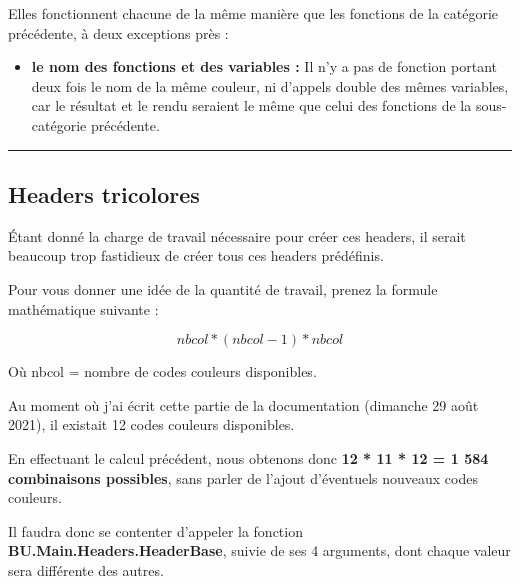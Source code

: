 \documentclass[a4paper,10pt]{article}
\begin{document}
    \begin{justify}
        Elles fonctionnent chacune de la même manière que les fonctions de la catégorie précédente, à deux exceptions près :

        \begin{itemize}
            \item \textbf{le nom des fonctions et des variables :} Il n'y a pas de fonction portant deux fois le nom de la même couleur, ni d'appels double des mêmes variables, car le résultat et le rendu seraient le même que celui des fonctions de la sous-catégorie précédente.
        \end{itemize}
    \end{justify}

    \setlength{\parskip}{1em}




    \color{sec2}\par\noindent\rule{\textwidth}{0.4pt}\color{text}

    \color{sec2}
    \subsection{Headers tricolores}\color{text}

    \begin{justify}
        Étant donné la charge de travail nécessaire pour créer ces headers, il serait beaucoup trop fastidieux de créer tous ces headers prédéfinis.
    \end{justify}

    \begin{justify}
        Pour vous donner une idée de la quantité de travail, prenez la formule mathématique suivante :
    \end{justify}

    \[nbcol * (nbcol - 1) * nbcol\]

    \begin{justify}
        Où nbcol = nombre de codes couleurs disponibles.
    \end{justify}

    \begin{justify}
        Au moment où j'ai écrit cette partie de la documentation (dimanche 29 août 2021), il existait 12 codes couleurs disponibles.
    \end{justify}

    \begin{justify}
        En effectuant le calcul précédent, nous obtenons donc \textbf{12 * 11 * 12 = 1 584 combinaisons possibles}, sans parler de l'ajout d'éventuels nouveaux codes couleurs.
    \end{justify}

    \begin{justify}
        Il faudra donc se contenter d'appeler la fonction \textbf{\color{func}BU.Main.Headers.HeaderBase}, suivie de ses 4 arguments, dont chaque valeur sera différente des autres.
    \end{justify}
\end{document}
